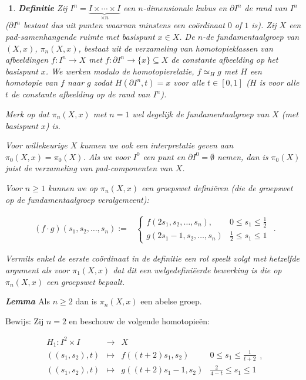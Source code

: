 \documentclass[12pt]{book}
\newcommand{\bew}{{\sc Bewijs: }}
\newenvironment{lem}{\begin{lemh}{\em {\bf Lemma }}}{\end{lemh}}
\newtheorem{dfh}[stelh]{$\!\!$}
\newenvironment{df}{\begin{dfh} \em {\bf Definitie }}{\end{dfh}}
\begin{document}
\begin{df} Zij $I^n=\underbrace{I\times \cdots \times I}_{\times n}$ een $n$-dimensionale
kubus en $\partial I^n$ de rand van $I^n$ ($\partial I^n$ bestaat dus uit punten waarvan minstens een
co\"ordinaat $0$ of $1$ is). Zij $X$ een pad-samenhangende ruimte met basispunt $x\in X$. De $n$-de
fundamentaalgroep van $(X,x)$, $\pi_{n}(X,x)$, bestaat uit de verzameling van homotopieklassen van
afbeeldingen $f: I^n \to X$ met $f:\partial I^n \to \{x\}\subseteq X$ de constante
afbeelding op het basispunt $x$. 
We werken modulo de homotopierelatie, $f\simeq_{H} g$ met $H$ een homotopie
van $f$ naar $g$ zodat $H(\partial I^n, t)=x$ voor alle $t\in [0,1]$ ($H$ is voor alle $t$ de
constante afbeelding op de rand van $I^n$).

Merk op dat $\pi_{n}(X,x)$ met $n=1$ wel degelijk de fundamentaalgroep van $X$ (met basispunt $x$) is.

 
Voor willekeurige $X$ kunnen we ook een interpretatie geven aan
$\pi_{0}(X,x)=\pi_{0}(X)$. Als we voor $I^{0}$ een punt en $\partial
I^{0}=\emptyset$  nemen, dan is $\pi_{0}(X)$ juist de verzameling van pad-componenten van $X$.

Voor $n\geq 1$ kunnen we op $\pi_{n}(X,x)$ een groepswet defini\"eren (die de groepswet op de
fundamentaalgroep veralgemeent):

$$\begin{array}{cl}
(f\cdot g)(s_1,s_2, \ldots , s_n):= & \left\{\begin{array}{ll}
f(2s_1, s_2, \ldots , s_n), & 0\leq s_1\leq \frac{1}{2}\\
g(2s_1-1, s_2, \ldots , s_n) & \frac{1}{2}\leq s_1\leq 1\end{array}\right.
\end{array}.$$

Vermits enkel de eerste co\"ordinaat in de definitie een rol speelt volgt met hetzelfde argument als
voor $\pi_{1}(X,x)$ dat dit een welgedefini\"eerde bewerking is die op $\pi_{n}(X,x)$ een groepswet
bepaalt.
\end{df}

\begin{lem} Als $n\geq 2$ dan is $\pi_{n}(X,x)$ een abelse groep.
\end{lem}

\bew Zij $n=2$ en beschouw de volgende homotopie\"en:

$$\begin{array}{rcll}
H_1:I^{2}\times I & \to & X\\
((s_1,s_2),t) & \mapsto & f((t+2)s_1,s_2) & 0\leq s_1\leq \frac{1}{t+2}\\
((s_1,s_2),t) & \mapsto & g((t+2)s_1-1,s_2) & \frac{2}{4-t}\leq s_1\leq 1\end{array},$$
\end{document}
